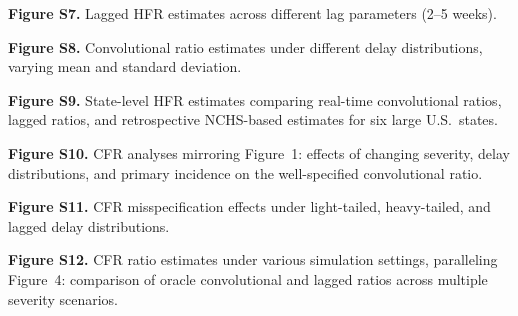 \documentclass{article}
\begin{document}
\noindent \textbf{Figure S7.} Lagged HFR estimates across different lag parameters (2–5 weeks).

\noindent \textbf{Figure S8.} Convolutional ratio estimates under different delay distributions, varying mean and standard deviation.

\noindent \textbf{Figure S9.} State-level HFR estimates comparing real-time convolutional ratios, lagged ratios, and retrospective NCHS-based estimates for six large U.S.\ states.

\noindent \textbf{Figure S10.} CFR analyses mirroring Figure~1: effects of changing severity, delay distributions, and primary incidence on the well-specified convolutional ratio.

\noindent \textbf{Figure S11.} CFR misspecification effects under light-tailed, heavy-tailed, and lagged delay distributions.

\noindent \textbf{Figure S12.} CFR ratio estimates under various simulation settings, paralleling Figure~4: comparison of oracle convolutional and lagged ratios across multiple severity scenarios.
\end{document}
